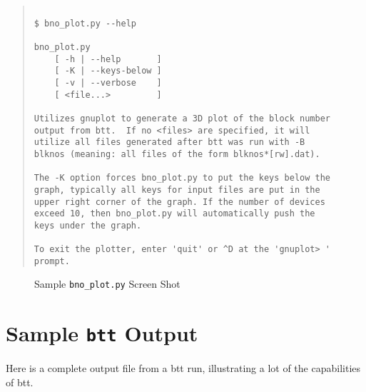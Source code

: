 \documentclass{article}
\begin{document}
\begin{quotation}
\begin{verbatim}

$ bno_plot.py --help

bno_plot.py
	[ -h | --help       ]
	[ -K | --keys-below ]
	[ -v | --verbose    ]
	[ <file...>         ]

Utilizes gnuplot to generate a 3D plot of the block number
output from btt.  If no <files> are specified, it will
utilize all files generated after btt was run with -B
blknos (meaning: all files of the form blknos*[rw].dat).

The -K option forces bno_plot.py to put the keys below the
graph, typically all keys for input files are put in the
upper right corner of the graph. If the number of devices
exceed 10, then bno_plot.py will automatically push the
keys under the graph.

To exit the plotter, enter 'quit' or ^D at the 'gnuplot> '
prompt.
\end{verbatim}
\end{quotation}

\begin{figure}[b]
\leavevmode\centering
{}
\caption{\label{fig:bno_plot}Sample \texttt{bno\_plot.py} Screen Shot}
\end{figure}

\clearpage
\newpage\section{\label{sec:appendix}Sample \texttt{btt}
Output}
  Here is a complete output file from a btt run, illustrating a lot of the
  capabilities of btt.

\end{document}
